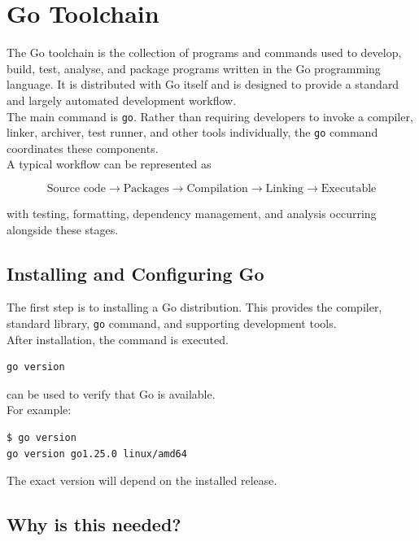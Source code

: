 \section{Go Toolchain}
The Go toolchain is the collection of programs and commands used to
develop, build, test, analyse, and package programs written in the Go
programming language.  It is distributed with Go itself and is designed
to provide a standard and largely automated development workflow.\\

The main command is \texttt{go}.  Rather than requiring developers to
invoke a compiler, linker, archiver, test runner, and other tools
individually, the \texttt{go} command coordinates these components.\\

A typical workflow can be represented as

\textbf{
\[
\text{Source code}
\longrightarrow
\text{Packages}
\longrightarrow
\text{Compilation}
\longrightarrow
\text{Linking}
\longrightarrow
\text{Executable}
\]
}

with testing, formatting, dependency management, and analysis occurring
alongside these stages.

\subsection{Installing and Configuring Go}

The first step is to installing a Go distribution.  This provides the
compiler, standard library, \texttt{go} command, and supporting
development tools.\\

After installation, the command is executed.

\begin{lstlisting}
go version
\end{lstlisting}

can be used to verify that Go is available.\\

For example:

\begin{lstlisting}
$ go version
go version go1.25.0 linux/amd64
\end{lstlisting}

The exact version will depend on the installed release.

\subsection*{Why is this needed?}

